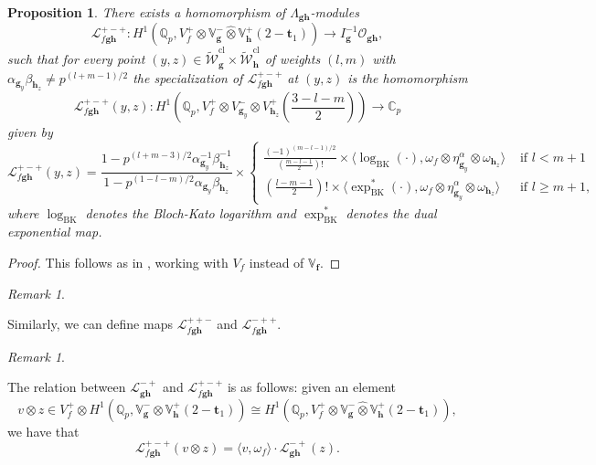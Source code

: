 \documentclass[a4paper,11pt]{amsart}
\theoremstyle{plain}
\newtheorem{propo}[theorem]{Proposition}
\theoremstyle{definition}
\theoremstyle{remark}
\newtheorem{remarkwr}[theorem]{Remark}
\newenvironment{remark}{\begin{remarkwr}\begin{upshape}}{\end{upshape}\end{remarkwr}}
\newcommand{\bb}{\mathbb}
\newcommand{\cl}{\mathcal}
\DeclareMathOperator{\BK}{BK}
\newcommand{\hf}{{\mathbf{f}}}
\newcommand{\hg}{{\mathbf{g}}}
\newcommand{\hh}{{\mathbf h}}
\numberwithin{equation}{section}
\begin{document}
\begin{propo}\label{perrin2}
There exists a homomorphism of $\Lambda_{\hg \hh}$-modules
\[
\mathcal L_{f \hg \hh}^{+-+}: H^1(\mathbb Q_p, V_f^+ \otimes\mathbb V_{\hg}^- \hat \otimes \mathbb V_{\hh}^+ (2-\mathbf{t}_1)) \rightarrow I_\hg^{-1} \cl{O}_{\hg \hh },
\]
such that for every point $(y,z) \in \tilde{\cl{W}}_{\hg}^{\mathrm{cl}}\times \tilde{\cl{W}}_{\hh}^{\mathrm{cl}}$ of weights $(l,m)$ with $\alpha_{\hg_y}\beta_{\hh_z}\neq p^{(l+m-1)/2}$ the specialization of $\mathcal L_{f \hg \hh}^{+-+}$ at $(y,z)$ is the homomorphism
\[
\mathcal L_{{f\hg\hh}}^{+-+}(y,z): H^1\left(\mathbb Q_p, V_{f}^+\otimes V_{\hg_y}^- \otimes V_{\hh_z}^+\left(\frac{3-l-m}{2}\right)\right) \rightarrow \mathbb C_p
\]
given by
\[
\mathcal L_{{f\hg\hh}}^{+-+}(y,z) = \frac{1-p^{(l+m-3)/2} \alpha_{\hg_y}^{-1}\beta_{\hh_z}^{-1}}{1-p^{(1-l-m)/2} \alpha_{\hg_y} \beta_{\hh_z}} \times \begin{cases} \frac{(-1)^{(m-l-1)/2}}{\left(\frac{m-l-1}{2}\right)!} \times \langle \log_{\BK}(\cdot), \omega_{f}\otimes\eta_{\hg_y}^\alpha \otimes \omega_{\hh_z} \rangle & \text{ if } l < m+1 \\ \left(\frac{l-m-1}{2}\right)! \times \langle \exp_{\BK}^*(\cdot), \omega_{f} \otimes\eta_{\hg_y}^\alpha \otimes \omega_{\hh_z} \rangle & \text{ if } l \geq m+1, \end{cases}
\]
where $\log_{\BK}$ denotes the Bloch-Kato logarithm and $\exp_{\BK}^*$ denotes the dual exponential map.
\end{propo}
\begin{proof}
This follows as in \cite[Proposition~7.3]{BSV}, working with $V_f$ instead of $\bb{V}_{\hf}$.
\end{proof}

\begin{remark}
    Similarly, we can define maps $\cl{L}_{f\hg\hh}^{++-}$ and $\cl{L}_{f\hg\hh}^{-++}$.
\end{remark}

\begin{remark}
    The relation between $\cl{L}_{\hg\hh}^{-+}$ and $\cl{L}_{f\hg\hh}^{+-+}$ is as follows: given an element
    \[
    v\otimes z\in V_f^+\otimes H^1(\mathbb Q_p, \mathbb V_{\hg}^- \hat \otimes \mathbb V_{\hh}^+ (2-\mathbf{t}_1))\cong H^1(\mathbb Q_p, V_f^+ \otimes\mathbb V_{\hg}^- \hat \otimes \mathbb V_{\hh}^+ (2-\mathbf{t}_1)),
    \]
    we have that
    \[
    \cl{L}_{f\hg\hh}^{+-+}(v\otimes z)=\langle v,\omega_f\rangle \cdot \cl{L}_{\hg\hh}^{-+}(z).
    \]
\end{remark}
\end{document}
